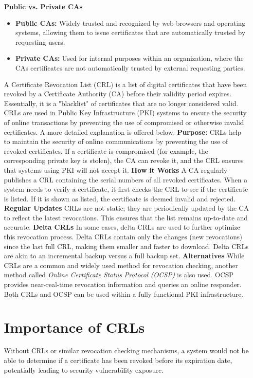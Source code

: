 \textbf{Public vs. Private CAs}
\begin{itemize}
    \item \textbf{Public CAs:} Widely trusted and recognized by web browsers and operating systems, allowing them to issue certificates that are automatically trusted by requesting users.
    \item \textbf{Private CAs:} Used for internal purposes within an organization, where the CAs certificates are not automatically trusted by external requesting parties.
\end{itemize}

 A Certificate Revocation List (CRL) is a list of digital certificates that have been revoked by a Certificate Authority (CA) before their validity period expires. Essentially, it is a "blacklist" of certificates that are no longer considered valid. CRLs are used in Public Key Infrastructure (PKI) systems to ensure the security of online transactions by preventing the use of compromised or otherwise invalid certificates. A more detailed explanation is offered below.
\textbf{Purpose:}
CRLs help to maintain the security of online communications by preventing the use of revoked certificates. If a certificate is compromised (for example, the corresponding private key is stolen), the CA can revoke it, and the CRL ensures that systems using PKI will not accept it.
\textbf{How it Works}
A CA regularly publishes a CRL containing the serial numbers of all revoked certificates. When a system needs to verify a certificate, it first checks the CRL to see if the certificate is listed. If it is shown as listed, the certificate is deemed invalid and rejected.
\textbf{Regular Updates}
CRLs are not static; they are periodically updated by the CA to reflect the latest revocations. This ensures that the list remains up-to-date and accurate.
\textbf{Delta CRLs}
In some cases, delta CRLs are used to further optimize this revocation process. Delta CRLs contain only the changes (new revocations) since the last full CRL, making them smaller and faster to download. Delta CRLs are akin to an incremental backup versus a full backup set.
\textbf{Alternatives}
While CRLs are a common and widely used method for revocation checking, another method called \textit{Online Certificate Status Protocol (OCSP)} is also used. OCSP provides near-real-time revocation information and queries an online responder. Both CRLs and OCSP can be used within a fully functional PKI infrastructure.

\section{Importance of CRLs}
Without CRLs or similar revocation checking mechanisms, a system would not be able to determine if a certificate has been revoked before its expiration date, potentially leading to security vulnerability exposure.

